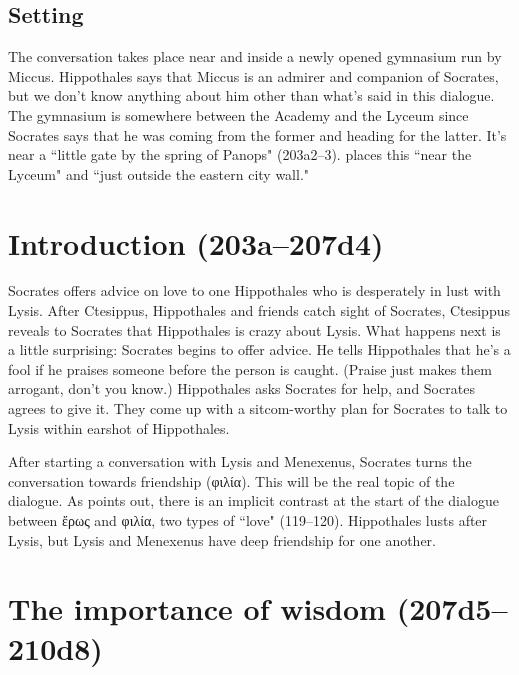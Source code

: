 \documentclass[11pt]{article}
\begin{document}
\subsection{Setting}

The conversation takes place near and inside a newly opened gymnasium run by
Miccus.  Hippothales says that Miccus is an admirer and companion of Socrates,
but we don't know anything about him other than what's said in this dialogue.
The gymnasium is somewhere between the Academy and the Lyceum since Socrates
says that he was coming from the former and heading for the latter.  It's near
a ``little gate by the spring of Panops" (203a2--3).  \citet{race1983} places
this ``near the Lyceum" and ``just outside the eastern city wall."



\section{Introduction (203a--207d4)}

Socrates offers advice on love to one Hippothales who is desperately in lust
with Lysis.  After Ctesippus, Hippothales and friends catch sight of Socrates,
Ctesippus reveals to Socrates that Hippothales is crazy about Lysis.  What
happens next is a little surprising: Socrates begins to offer advice.  He tells
Hippothales that he's a fool if he praises someone before the person is caught.
(Praise just makes them arrogant, don't you know.)  Hippothales asks Socrates
for help, and Socrates agrees to give it.  They come up with a sitcom-worthy
plan for Socrates to talk to Lysis within earshot of Hippothales.

After starting a conversation with Lysis and Menexenus, Socrates turns the
conversation towards friendship ({\g φιλία}).  This will be the real topic of
the dialogue.  As \citet{watt1987} points out, there is an implicit contrast at
the start of the dialogue between {\g ἔρως} and {\g φιλία}, two types of
``love" (119--120).  Hippothales lusts after Lysis, but Lysis and Menexenus
have deep friendship for one another.


\section{The importance of wisdom (207d5--210d8)}
\end{document}
